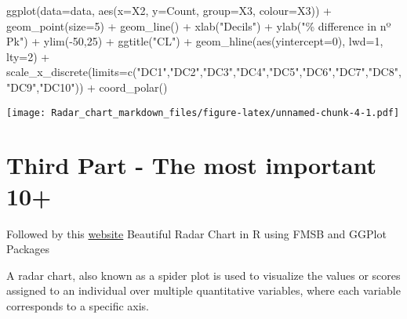 \documentclass[
]{article}
\newenvironment{Shaded}{\begin{snugshade}}{\end{snugshade}}
\newcommand{\AttributeTok}[1]{\textcolor[rgb]{0.77,0.63,0.00}{#1}}
\newcommand{\DecValTok}[1]{\textcolor[rgb]{0.00,0.00,0.81}{#1}}
\newcommand{\FunctionTok}[1]{\textcolor[rgb]{0.00,0.00,0.00}{#1}}
\newcommand{\NormalTok}[1]{#1}
\newcommand{\SpecialCharTok}[1]{\textcolor[rgb]{0.00,0.00,0.00}{#1}}
\newcommand{\StringTok}[1]{\textcolor[rgb]{0.31,0.60,0.02}{#1}}
\begin{document}
\begin{Shaded}
\begin{Highlighting}[]
\FunctionTok{ggplot}\NormalTok{(}\AttributeTok{data=}\NormalTok{data,  }\FunctionTok{aes}\NormalTok{(}\AttributeTok{x=}\NormalTok{X2, }\AttributeTok{y=}\NormalTok{Count, }\AttributeTok{group=}\NormalTok{X3, }\AttributeTok{colour=}\NormalTok{X3)) }\SpecialCharTok{+} 
  \FunctionTok{geom\_point}\NormalTok{(}\AttributeTok{size=}\DecValTok{5}\NormalTok{) }\SpecialCharTok{+} 
  \FunctionTok{geom\_line}\NormalTok{() }\SpecialCharTok{+} 
  \FunctionTok{xlab}\NormalTok{(}\StringTok{"Decils"}\NormalTok{) }\SpecialCharTok{+} 
  \FunctionTok{ylab}\NormalTok{(}\StringTok{"\% difference in nº Pk"}\NormalTok{) }\SpecialCharTok{+} 
  \FunctionTok{ylim}\NormalTok{(}\SpecialCharTok{{-}}\DecValTok{50}\NormalTok{,}\DecValTok{25}\NormalTok{) }\SpecialCharTok{+} \FunctionTok{ggtitle}\NormalTok{(}\StringTok{"CL"}\NormalTok{)  }\SpecialCharTok{+} 
  \FunctionTok{geom\_hline}\NormalTok{(}\FunctionTok{aes}\NormalTok{(}\AttributeTok{yintercept=}\DecValTok{0}\NormalTok{), }\AttributeTok{lwd=}\DecValTok{1}\NormalTok{, }\AttributeTok{lty=}\DecValTok{2}\NormalTok{) }\SpecialCharTok{+} 
  \FunctionTok{scale\_x\_discrete}\NormalTok{(}\AttributeTok{limits=}\FunctionTok{c}\NormalTok{(}\StringTok{"DC1"}\NormalTok{,}\StringTok{"DC2"}\NormalTok{,}\StringTok{"DC3"}\NormalTok{,}\StringTok{"DC4"}\NormalTok{,}\StringTok{"DC5"}\NormalTok{,}\StringTok{"DC6"}\NormalTok{,}\StringTok{"DC7"}\NormalTok{,}\StringTok{"DC8"}\NormalTok{,}\StringTok{"DC9"}\NormalTok{,}\StringTok{"DC10"}\NormalTok{)) }\SpecialCharTok{+}
  \FunctionTok{coord\_polar}\NormalTok{()}
\end{Highlighting}
\end{Shaded}

\texttt{[image: Radar\_chart\_markdown\_files/figure-latex/unnamed-chunk-4-1.pdf]}

\hypertarget{third-part---the-most-important-10}{%
\section{Third Part - The most important
10+}\label{third-part---the-most-important-10}}

Followed by this
\href{https://www.datanovia.com/en/blog/beautiful-radar-chart-in-r-using-fmsb-and-ggplot-packages/}{website}
Beautiful Radar Chart in R using FMSB and GGPlot Packages

A radar chart, also known as a spider plot is used to visualize the
values or scores assigned to an individual over multiple quantitative
variables, where each variable corresponds to a specific axis.
\end{document}
